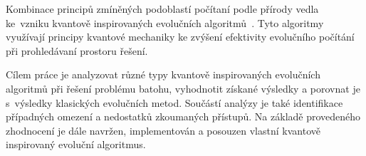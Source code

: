 Kombinace principů zmíněných podoblastí počítaní podle přírody vedla ke~vzniku kvantově inspirovaných evolučních algoritmů~\cite{QIEA-survey1,QIEA-survey2}. 
Tyto algoritmy využívají principy kvantové mechaniky ke zvýšení efektivity evolučního počítání při prohledávaní prostoru řešení. 

Cílem práce je analyzovat různé typy kvantově inspirovaných evolučních algoritmů při řešení problému batohu, vyhodnotit získané výsledky a porovnat je s~výsledky klasických evolučních metod. 
Součástí analýzy je také identifikace případných omezení a nedostatků zkoumaných přístupů. 
Na základě provedeného zhodnocení je dále navržen, implementován a posouzen vlastní kvantově inspirovaný evoluční algoritmus. 

